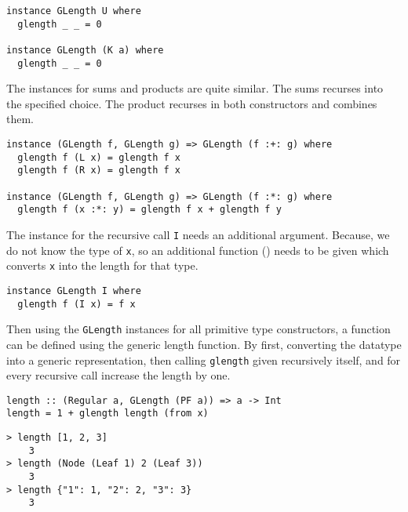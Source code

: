 \begin{verbatim}
instance GLength U where
  glength _ _ = 0

instance GLength (K a) where
  glength _ _ = 0
\end{verbatim}

The instances for sums and products are quite similar. The sums recurses into the specified choice. The product recurses in both constructors and combines them.

\begin{verbatim}
instance (GLength f, GLength g) => GLength (f :+: g) where
  glength f (L x) = glength f x
  glength f (R x) = glength f x

instance (GLength f, GLength g) => GLength (f :*: g) where
  glength f (x :*: y) = glength f x + glength f y
\end{verbatim}

The instance for the recursive call \texttt{I} needs an additional argument. Because, we do not know the type of \texttt{x}, so an additional function () needs to be given which converts \texttt{x} into the length for that type.

\begin{verbatim}
instance GLength I where
  glength f (I x) = f x
\end{verbatim}

Then using the \texttt{GLength} instances for all primitive type constructors, a function can be defined using the generic length function. By first, converting the datatype into a generic representation, then calling \texttt{glength} given recursively itself, and for every recursive call increase the length by one. 

\begin{verbatim}
length :: (Regular a, GLength (PF a)) => a -> Int
length = 1 + glength length (from x)
\end{verbatim}

\begin{verbatim}
> length [1, 2, 3]
    3
> length (Node (Leaf 1) 2 (Leaf 3))
    3
> length {"1": 1, "2": 2, "3": 3}
    3
\end{verbatim}






